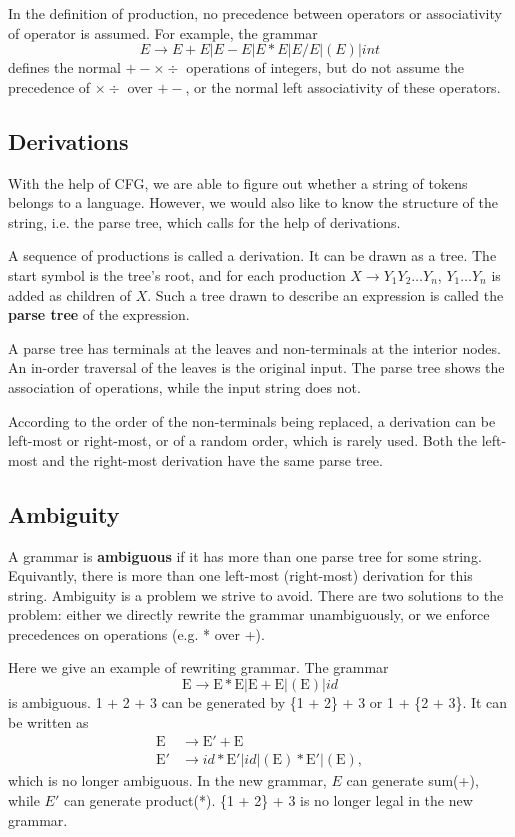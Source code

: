 In the definition of production,  no precedence between operators or associativity of operator is assumed. For example, the grammar 
\begin{equation}\label{intops}
E\rightarrow E + E | E - E | E * E | E/E | (E) | int
\end{equation}
defines the normal $+-\times \div$ operations of integers, but do not assume the precedence of $\times \div$ over $+-$, or the normal left associativity of these operators.
\subsection{Derivations}
With the help of CFG, we are able to figure out whether a string of tokens belongs to a language. However, we would also like to know the structure of the string, i.e. the parse tree, which calls for the help of derivations.

A sequence of productions is called a derivation. It can be drawn as a tree. The start symbol is the tree's root, and for each production $X\rightarrow Y_1Y_2\dots Y_n$, $Y_1\dots Y_n$ is added as children of $X$. Such a tree drawn to describe an expression is called the {\bf parse tree} of the expression.

A parse tree has terminals at the leaves and non-terminals at the interior nodes. An in-order traversal of the leaves is the original input. The parse tree shows the association of operations, while the input string does not.

According to the order of the non-terminals being replaced, a derivation can be left-most or right-most, or of a random order, which is rarely used. Both the left-most and the right-most derivation have the same parse tree.
\subsection{Ambiguity}
A grammar is {\bf ambiguous} if it has more than one parse tree for some string. Equivantly, there is more than one left-most (right-most) derivation for this string. Ambiguity is a problem we strive to avoid. There are two solutions to the problem: either we directly rewrite the grammar unambiguously, or we enforce precedences on operations (e.g. * over +).

Here we give an example of rewriting grammar. The grammar
\begin{equation}
\text{E}\rightarrow \text{E}*\text{E} | \text{E}+\text{E} | (\text{E}) | id
\end{equation}
is ambiguous. 1 + 2 + 3 can be generated by \{1 + 2\} + 3 or 1 + \{2 + 3\}. It can be written as 
\begin{equation}
\begin{split}
\text{E}&\rightarrow \text{E}' + \text{E}\\
\text{E}'&\rightarrow id * \text{E}' | id | (\text{E}) * \text{E}' | (\text{E}),
\end{split}
\end{equation}
which is no longer ambiguous. In the new grammar, $E$ can generate sum(+), while $E'$ can generate product(*). \{1 + 2\} + 3 is no longer legal in the new grammar.

